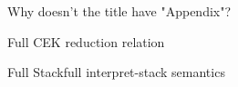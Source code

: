 \begin{appendices}
    \begin{todo}
        Why doesn't the title have "Appendix"?
    \end{todo}

    \begin{figure-here}
        Full CEK reduction relation
    \end{figure-here}

    \begin{figure-here}
        Full Stackfull interpret-stack semantics
    \end{figure-here}


\end{appendices}